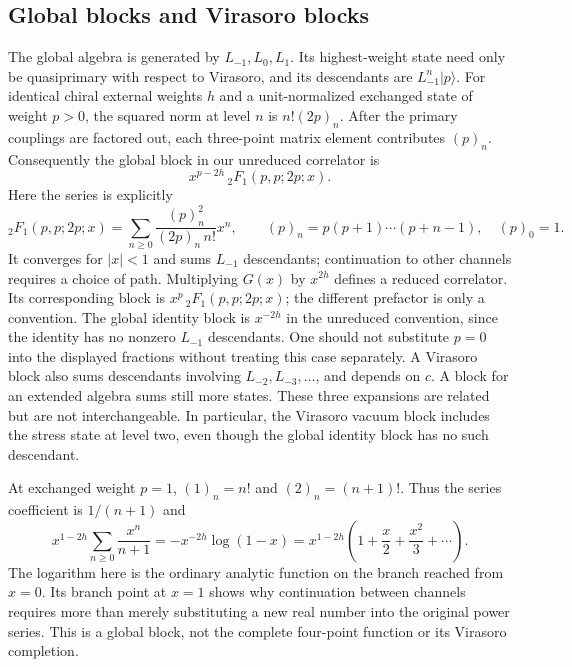 \subsection{Global blocks and Virasoro blocks}

The global algebra is generated by $L_{-1},L_0,L_1$. Its
highest-weight state need only be quasiprimary with respect to
Virasoro, and its descendants are $L_{-1}^n|p\rangle$.
For identical chiral external weights $h$ and a unit-normalized
exchanged state of weight $p>0$, the squared norm at level $n$ is
$n!(2p)_n$. After the primary couplings are factored
out, each three-point matrix element contributes $(p)_n$.
Consequently the global block in our unreduced correlator is
\[
 x^{p-2h}\,{}_2F_1(p,p;2p;x).
\]
Here the series is explicitly
\[
 {}_2F_1(p,p;2p;x)
 =\sum_{n\ge0}\frac{(p)_n^2}{(2p)_n\,n!}x^n,
 \qquad (p)_n=p(p+1)\cdots(p+n-1),\quad(p)_0=1.
\]
It converges for $|x|<1$ and sums $L_{-1}$ descendants;
continuation to other channels requires a choice of path.
Multiplying $G(x)$ by $x^{2h}$ defines a reduced correlator. Its
corresponding block is $x^p\,{}_2F_1(p,p;2p;x)$; the different
prefactor is only a convention. The global identity block is
$x^{-2h}$ in the unreduced convention, since the identity has no
nonzero $L_{-1}$ descendants. One should not substitute $p=0$
into the displayed fractions without treating this case separately.
A Virasoro block
also sums descendants involving $L_{-2},L_{-3},\ldots$, and depends
on $c$. A block for an extended algebra sums still more states.
These three expansions are related but are not interchangeable.
In particular, the Virasoro vacuum block includes the stress state
at level two, even though the global identity block has no such
descendant.

\begin{example}
\label{ex:cft-global-logarithm}
At exchanged weight $p=1$, $(1)_n=n!$ and $(2)_n=(n+1)!$.
Thus the series coefficient is $1/(n+1)$ and
\[
 x^{1-2h}\sum_{n\ge0}\frac{x^n}{n+1}
 =-x^{-2h}\log(1-x)
 =x^{1-2h}\left(1+\frac{x}{2}+\frac{x^2}{3}+\cdots\right).
\]
The logarithm here is the ordinary analytic function on the branch
reached from $x=0$. Its branch point at $x=1$ shows why continuation
between channels requires more than merely substituting a new real
number into the original power series. This is a global block, not
the complete four-point function or its Virasoro completion.
\end{example}

